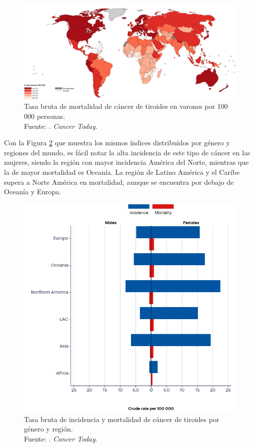 \begin{figure}[H]
	\begin{center}
		\includegraphics[width=1.00 \textwidth]{1/figures/tb_mor_ct_varones.png}
		\caption[Tasa bruta de mortalidad de cáncer de tiroides en varones por 100 000 personas]{Tasa bruta de mortalidad de cáncer de tiroides en varones por 100 000 personas. \\
		Fuente: \cite{ws_oms2022cancert}. \textit{Cancer Today}.}
		\label{1:fig4}
	\end{center}
\end{figure}

Con la Figura \ref{1:fig5} que muestra los mismos índices distribuidos por género y regiones del mundo, es fácil notar la alta incidencia de este tipo de cáncer en las mujeres, siendo la región con mayor incidencia América del Norte, mientras que la de mayor mortalidad es Oceanía. La región de Latino América y el Caribe supera a Norte América en mortalidad, aunque se encuentra por debajo de Oceanía y Europa.

\begin{figure}[H]
	\begin{center}
		\includegraphics[width=0.60 \textwidth]{1/figures/tb_inc_mor_gen_y_reg.png}
		\caption[Tasa bruta de incidencia y mortalidad de cáncer de tiroides por género y región]{Tasa bruta de incidencia y mortalidad de cáncer de tiroides por género y región. \\
		Fuente: \cite{ws_oms2022cancert}. \textit{Cancer Today}.}
		\label{1:fig5}
	\end{center}
\end{figure}


